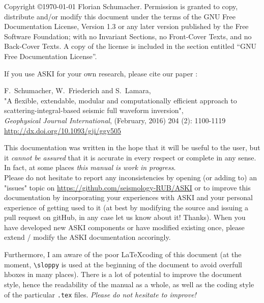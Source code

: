 \documentclass[12pt,a4paper]{book}
\newcommand{\lcode}[1]{\nolinkurl{#1}}
\newcommand{\ASKI}{{\ttfamily ASKI}}
\begin{document}
\sloppy
%
\setlength{\parindent}{0em}
\setlength{\parskip}{0.5em}
%
%

%
Copyright \copyright {\myyear \today} Florian Schumacher.
Permission is granted to copy, distribute and/or modify this document
under the terms of the GNU Free Documentation License, Version 1.3
or any later version published by the Free Software Foundation;
with no Invariant Sections, no Front-Cover Texts, and no Back-Cover Texts.
A copy of the license is included in the section entitled ``GNU
Free Documentation License''.

\vspace{1cm}

If you use \ASKI{} for your own research, please cite our paper \cite{Schumacher16}:

F.\ Schumacher, W.\ Friederich and S.\ Lamara, \\
"A flexible, extendable, modular and 
computationally efficient approach to scattering-integral-based seismic full waveform 
inversion", \\
\emph{Geophysical Journal International}, (February, 2016) 204 (2): 1100-1119\\
\url{http://dx.doi.org/10.1093/gji/ggv505}

\vspace{1em}

This documentation was written in the hope that it will be useful to the user,
but it \emph{cannot be assured} that it is accurate in every respect or complete in any sense.
In fact, at some places \emph{this manual is work in progress}.\\
Please do not hesitate to report any inconsistencies by
opening (or adding to) an "issues" topic on \url{https://github.com/seismology-RUB/ASKI}
or to improve this documentation by incorporating your experiences with \ASKI{} 
and your personal experience of getting used to it (at best by modifying the source and issuing a pull request
on gitHub, in any case let us know about it! Thanks). 
When you have developed new \ASKI{} components or 
have modified existing once, please extend / modify the \ASKI{} documentation accoringly.

Furthermore, I am aware of the poor \LaTeX coding of this document (at the moment, \verb+\sloppy+ is used
at the beginning of the document to avoid overfull hboxes in many places). There is a lot of potential
to improve the document 
style, hence the readability of the manual as a whole, as well as the coding style of the 
particular \lcode{.tex} files. \emph{Please do not hesitate to improve!}
\end{document}

